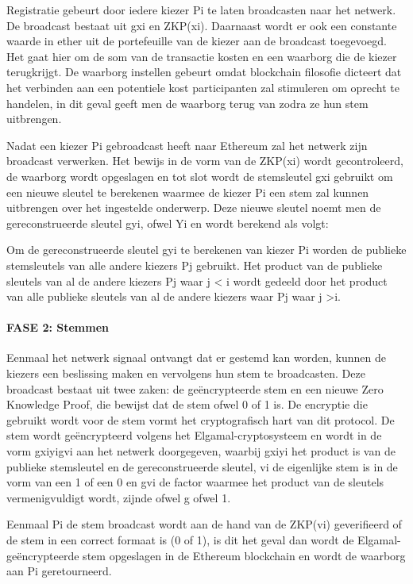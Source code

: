 			Registratie gebeurt door iedere kiezer Pi te laten broadcasten naar het netwerk. De broadcast bestaat uit gxi en ZKP(xi). Daarnaast wordt er ook een constante waarde in ether uit de portefeuille van de kiezer aan de broadcast toegevoegd. Het gaat hier om de som van de transactie kosten en een waarborg die de kiezer terugkrijgt. De waarborg instellen gebeurt omdat blockchain filosofie dicteert dat het verbinden aan een potentiele kost participanten zal stimuleren om oprecht te handelen, in dit geval geeft men de waarborg terug van zodra ze hun stem uitbrengen. 
			
			Nadat een kiezer Pi  gebroadcast heeft naar Ethereum zal het netwerk zijn broadcast verwerken.
			Het bewijs in de vorm van de ZKP(xi) wordt gecontroleerd, de waarborg wordt opgeslagen en tot slot wordt de  stemsleutel gxi gebruikt om een nieuwe sleutel te berekenen waarmee de kiezer Pi een stem zal kunnen uitbrengen over het ingestelde onderwerp. Deze nieuwe sleutel noemt men de gereconstrueerde sleutel gyi, ofwel Yi en wordt berekend als volgt:
			
			Om de gereconstrueerde sleutel  gyi te berekenen van kiezer Pi worden de publieke stemsleutels van alle andere kiezers Pj gebruikt. Het product van de publieke sleutels van al de andere kiezers Pj waar  j <  i wordt gedeeld door het product van alle publieke sleutels van al de andere kiezers waar Pj waar  j >i.
			\paragraph*{FASE 2: Stemmen}
			Eenmaal het netwerk signaal ontvangt dat er gestemd kan worden, kunnen de kiezers een beslissing maken en vervolgens hun stem te broadcasten. Deze broadcast bestaat uit twee zaken: de geëncrypteerde stem en een nieuwe Zero Knowledge Proof, die bewijst dat de stem ofwel 0 of 1 is. De encryptie die gebruikt wordt voor de stem vormt het cryptografisch hart van dit protocol. De stem wordt geëncrypteerd volgens het Elgamal-cryptosysteem en wordt in de vorm gxiyigvi  aan het netwerk doorgegeven,  waarbij gxiyi het product is van de publieke stemsleutel en de gereconstrueerde sleutel, vi de eigenlijke stem is in de vorm van een 1 of een 0 en gvi de factor waarmee het product van de sleutels vermenigvuldigt wordt, zijnde ofwel g ofwel 1. 
			
			Eenmaal Pi de stem broadcast wordt aan de hand van de ZKP(vi) geverifieerd of de stem in een correct formaat is (0 of 1), is dit het geval dan wordt de Elgamal-geëncrypteerde stem opgeslagen in de Ethereum blockchain en wordt de waarborg aan Pi geretourneerd.
			
